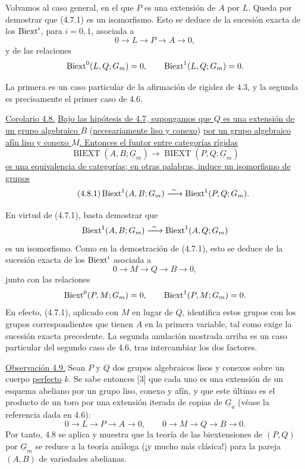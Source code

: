 Volvamos al caso general, en el que $P$ es una extensión de $A$ por
$L$. Queda por demostrar que (4.7.1) es un isomorfismo. Esto se deduce
de la sucesión exacta de los $\operatorname{Biext}^i$, para $i=0,1$, asociada a
\[
 0\longrightarrow L\longrightarrow P\longrightarrow A
 \longrightarrow0,
\]
y de las relaciones
\[
 \operatorname{Biext}^0(L,Q;G_m)=0,
 \qquad
 \operatorname{Biext}^1(L,Q;G_m)=0.
\]


La primera es un caso particular de la afirmación de rigidez de 4.3,
y la segunda es precisamente el primer caso de 4.6.

\medskip
\noindent\underline{Corolario 4.8.} \underline{Bajo las hipótesis de
4.7, supongamos que $Q$ es una extensión de un grupo algebraico $B$}
(\underline{necesariamente liso y conexo}) \underline{por un grupo algebraico afín liso y
conexo $M$. Entonces el funtor entre categorías rígidas}
\[
 \operatorname{BIEXT}(A,B;\underline G_m)
 \longrightarrow
 \operatorname{BIEXT}(P,Q;\underline G_m)
\]
\underline{es una equivalencia de categorías; en otras palabras,
induce un isomorfismo de grupos}
\begin{equation}\tag{4.8.1}
 \operatorname{Biext}^1(A,B;G_m)
 \xrightarrow{\ \sim\ }
 \operatorname{Biext}^1(P,Q;G_m).
\end{equation}

En virtud de (4.7.1), basta demostrar que
\[
 \operatorname{Biext}^1(A,B;G_m)
 \xrightarrow{\ \sim\ }
 \operatorname{Biext}^1(A,Q;G_m)
\]
es un isomorfismo. Como en la demostración de (4.7.1), esto se deduce
de la sucesión exacta de los $\operatorname{Biext}^i$ asociada a
\[
 0\longrightarrow M\longrightarrow Q\longrightarrow B
 \longrightarrow0,
\]
junto con las relaciones
\[
 \operatorname{Biext}^0(P,M;G_m)=0,
 \qquad
 \operatorname{Biext}^1(P,M;G_m)=0.
\]
En efecto, (4.7.1), aplicado con $M$ en lugar de $Q$, identifica estos
grupos con los grupos correspondientes que tienen $A$ en la primera
variable, tal como exige la sucesión exacta precedente. La segunda
anulación mostrada arriba es un caso particular del segundo caso de
4.6, tras intercambiar los dos factores.


\medskip
\noindent\underline{Observación 4.9.} Sean $P$ y $Q$ dos grupos
algebraicos lisos y conexos sobre un cuerpo \underline{perfecto} $k$.
Se sabe entonces [3] que cada uno es una extensión de un esquema
abeliano por un grupo liso, conexo y afín, y que este último es el
producto de un toro por una extensión iterada de copias de
$\underline G_a$ (véase la referencia dada en 4.6):
\[
 0\longrightarrow L\longrightarrow P\longrightarrow A
 \longrightarrow0,
 \qquad
 0\longrightarrow M\longrightarrow Q\longrightarrow B
 \longrightarrow0.
\]
Por tanto, 4.8 se aplica y muestra que la teoría de las biextensiones
de $(P,Q)$ por $\underline G_m$ se reduce a la teoría análoga (¡y mucho
más clásica!) para la pareja $(A,B)$ de variedades abelianas.

